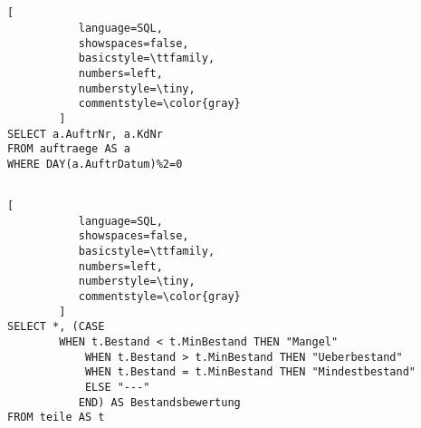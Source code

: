 \documentclass{article}
\begin{document}
\hfill \break
\subsection{}
\begin{lstlisting}[
           language=SQL,
           showspaces=false,
           basicstyle=\ttfamily,
           numbers=left,
           numberstyle=\tiny,
           commentstyle=\color{gray}
        ]
SELECT a.AuftrNr, a.KdNr
FROM auftraege AS a
WHERE DAY(a.AuftrDatum)%2=0
\end{lstlisting}

\hfill \break
\subsection{}
\begin{lstlisting}[
           language=SQL,
           showspaces=false,
           basicstyle=\ttfamily,
           numbers=left,
           numberstyle=\tiny,
           commentstyle=\color{gray}
        ]
SELECT *, (CASE
	    WHEN t.Bestand < t.MinBestand THEN "Mangel"
            WHEN t.Bestand > t.MinBestand THEN "Ueberbestand"
            WHEN t.Bestand = t.MinBestand THEN "Mindestbestand"
            ELSE "---"
           END) AS Bestandsbewertung
FROM teile AS t
\end{lstlisting}
\end{document}
